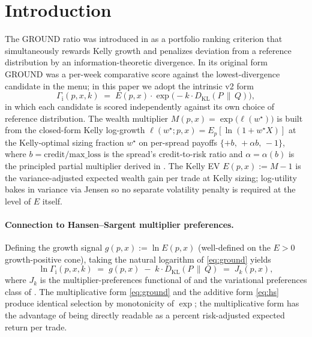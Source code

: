\documentclass[11pt]{article}
\newcommand{\GROUND}{\Gamma_{\mathrm{i}}}
\newcommand{\KL}{D_{\mathrm{KL}}}
\theoremstyle{definition}
\theoremstyle{remark}
\begin{document}
\section{Introduction}

The GROUND ratio was introduced in \citet{mercurio2020} as a portfolio
ranking criterion that simultaneously rewards Kelly growth and penalizes
deviation from a reference distribution by an information-theoretic
divergence. In its original form GROUND was a per-week comparative score
against the lowest-divergence candidate in the menu; in this paper we
adopt the intrinsic v2 form
\begin{equation}
\GROUND(p, x, k) \;=\; E(p, x) \cdot \exp\!\bigl(-k \cdot \KL(P \,\|\, Q)\bigr),
\label{eq:ground}
\end{equation}
in which each candidate is scored independently against its own choice
of reference distribution. The wealth multiplier $M(p, x) =
\exp\!\bigl(\ell(w^\star)\bigr)$ is built from the closed-form Kelly log-growth
$\ell(w^\star; p, x) = E_p[\ln(1 + w^\star X)]$ at the Kelly-optimal
sizing fraction $w^\star$ on per-spread payoffs
$\{+b,\, +\alpha b,\, -1\}$, where $b = \mathrm{credit}/\mathrm{max\_loss}$
is the spread's credit-to-risk ratio and $\alpha = \alpha(b)$ is the
principled partial multiplier derived in \citet{mercurio2020}. The Kelly
EV $E(p, x) := M - 1$ is the variance-adjusted expected wealth gain per
trade at Kelly sizing; log-utility bakes in variance via Jensen so
no separate volatility penalty is required at the level of
$E$ itself.

\paragraph{Connection to Hansen--Sargent multiplier preferences.}
Defining the growth signal $g(p, x) := \ln E(p, x)$ (well-defined on the
$E > 0$ growth-positive cone), taking the natural logarithm of
\eqref{eq:ground} yields
\begin{equation}
\ln \GROUND(p, x, k) \;=\; g(p, x) \;-\; k \cdot \KL(P \,\|\, Q) \;=\; J_k(p, x),
\label{eq:hs}
\end{equation}
where $J_k$ is the multiplier-preferences functional of
\citet{hansen2008robustness} and the variational preferences class of
\citet{maccheroni2006ambiguity}. The multiplicative form
\eqref{eq:ground} and the additive form \eqref{eq:hs} produce identical
selection by monotonicity of $\exp$; the multiplicative form has the
advantage of being directly readable as a percent risk-adjusted
expected return per trade.
\end{document}
